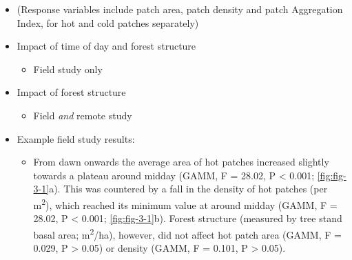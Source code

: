 \documentclass[12pt,a4paper,]{report}
\providecommand{\tightlist}{%
  \setlength{\itemsep}{0pt}\setlength{\parskip}{0pt}}
\theoremstyle{definition}
\theoremstyle{definition}
\theoremstyle{definition}
\theoremstyle{remark}
\begin{document}
\begin{itemize}
\tightlist
\item
  (Response variables include patch area, patch density and patch
  Aggregation Index, for hot and cold patches separately)
\item
  Impact of time of day and forest structure

  \begin{itemize}
  \tightlist
  \item
    Field study only
  \end{itemize}
\item
  Impact of forest structure

  \begin{itemize}
  \tightlist
  \item
    Field \emph{and} remote study
  \end{itemize}
\item
  Example field study results:

  \begin{itemize}
  \tightlist
  \item
    From dawn onwards the average area of hot patches increased slightly
    towards a plateau around midday (GAMM, F = 28.02, P \textless{}
    0.001; \autoref{fig:fig-3-1}a). This was countered by a fall in the
    density of hot patches (per m\textsuperscript{2}), which reached its
    minimum value at around midday (GAMM, F = 28.02, P \textless{}
    0.001; \autoref{fig:fig-3-1}b). Forest structure (measured by tree
    stand basal area; m\textsuperscript{2}/ha), however, did not affect
    hot patch area (GAMM, F = 0.029, P \textgreater{} 0.05) or density
    (GAMM, F = 0.101, P \textgreater{} 0.05).
  \end{itemize}
\end{itemize}
\end{document}
